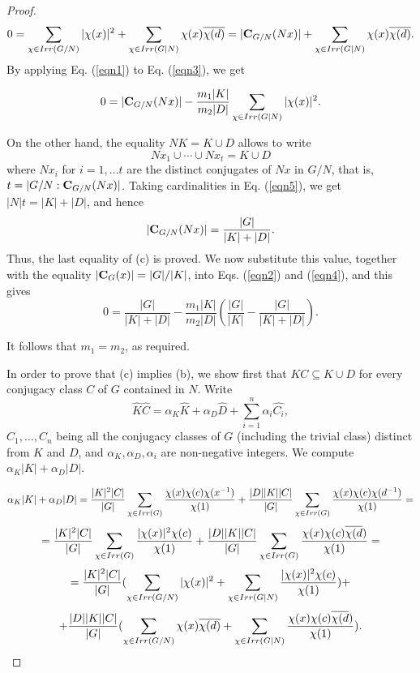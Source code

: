 \documentclass[10pt,a4paper]{amsart}
\begin{document}
\begin{proof}
\begin{equation} 0=\sum_{\chi\in {\rm Irr}(G/N)} |\chi(x)|^2
+ \sum_{\chi\in {\rm Irr}(G|N)}
 \chi(x)\overline{\chi(d)} =
|{\bf C}_{G/N}(Nx)| + \sum_{\chi\in {\rm Irr}(G|N)} \chi(x)\overline{\chi(d)}. \label{eqn3}
 \end{equation}
By applying Eq. (\ref{eqn1}) to Eq. (\ref{eqn3}), we get




\begin{equation}\label{eqn4}
0=|{\bf C}_{G/N}(Nx)| - \frac{m_1|K|}{m_2|D|}\sum_{\chi\in {\rm Irr}(G|N)}
 |\chi(x)|^2.
 \end{equation}

\noindent
On the other hand, the  equality $NK=K \cup D$ allows to write
\begin{equation}
Nx_1\cup \cdots \cup Nx_t= K\cup D \label{eqn5}
\end{equation}
where $Nx_i$ for $i=1,\ldots t$ are the distinct conjugates of $Nx$  in $G/N$, that is, $t=|G/N:{\bf C}_{G/N}(Nx)|$. Taking cardinalities in Eq. (\ref{eqn5}), we get $|N|t= |K|+ |D|$, and hence
$$|{\bf C}_{G/N}(Nx)|=  \frac{|G|}{|K|+ |D|}.$$
Thus, the last equality of (c) is proved.
We now substitute this value, together with the equality $|{\bf C}_G(x)|=|G|/|K|$, into  Eqs. (\ref{eqn2}) and (\ref{eqn4}),  and this gives
$$0= \frac{|G|}{|K|+ |D|}-\frac{m_1|K|}{m_2|D|}\left(\frac{|G|}{|K|}-\frac{|G|}{|K|+ |D|}\right).$$

\noindent
It follows that $m_1=m_2$, as required.

\medskip
In order to prove that (c) implies (b), we show first that $KC\subseteq K\cup D$ for every conjugacy class $C$ of $G$ contained in $N$. Write
 \begin{equation}\label{eqn6}
 \widehat{K}\widehat{C}=\alpha_K\widehat{K}+\alpha_D\widehat{D} + \sum_{i=1}^n \alpha_i \widehat{C_i},
 \end{equation}
 $C_1, \ldots , C_n$ being  all the conjugacy classes of $G$ (including the trivial class) distinct from $K$ and $D$, and $\alpha_K,\alpha_D, \alpha_i$ are non-negative integers. We compute  $\alpha_K|K| + \alpha_D|D|$.

 $$ \alpha_K|K| + \alpha_D|D|=\frac{|K|^2|C|}{|G|}\sum_{\chi\in {\rm Irr}(G)}\frac{\chi(x)\chi(c)\chi(x^{-1})}{\chi(1)}+
 \frac{|D||K||C|}{|G|}\sum_{\chi\in {\rm Irr}(G)}\frac{\chi(x)\chi(c)\chi(d^{-1})}{\chi(1)}=$$
 $$=\frac{|K|^2|C|}{|G|}\sum_{\chi\in {\rm Irr}(G)}\frac{|\chi(x)|^2\chi(c)}{\chi(1)}+
 \frac{|D||K||C|}{|G|}\sum_{\chi\in {\rm Irr}(G)}\frac{\chi(x)\chi(c)\overline{\chi(d})}{\chi(1)}= $$
 $$=\frac{|K|^2|C|}{|G|}(\sum_{\chi\in {\rm Irr}(G/N)}|\chi(x)|^2 + \sum_{\chi\in {\rm Irr}(G|N)}\frac{|\chi(x)|^2\chi(c)}{\chi(1)}) +$$
 $$+  \frac{|D||K||C|}{|G|}(\sum_{\chi\in {\rm Irr}(G/N)} \chi(x)\overline{\chi(d)} + \sum_{\chi\in {\rm Irr}(G|N)}\frac{\chi(x)\chi(c)\overline{\chi(d})}{\chi(1)}).$$


\end{proof}
\end{document}
